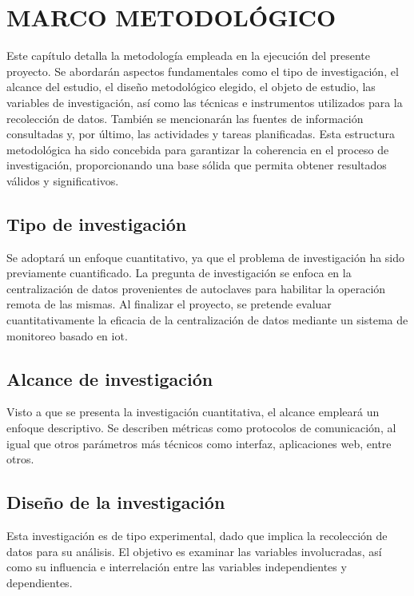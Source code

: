 
\newpage

%
%

\section{MARCO METODOLÓGICO}
Este capítulo detalla la metodología empleada en la ejecución del presente proyecto. Se abordarán aspectos fundamentales como el tipo de investigación, el alcance del estudio, el diseño metodológico elegido, el objeto de estudio, las variables de investigación, así como las técnicas e instrumentos utilizados para la recolección de datos. También se mencionarán las fuentes de información consultadas y, por último, las actividades y tareas planificadas. Esta estructura metodológica ha sido concebida para garantizar la coherencia en el proceso de investigación, proporcionando una base sólida que permita obtener resultados válidos y significativos.


\subsection{Tipo de investigación}
Se adoptará un enfoque cuantitativo, ya que el problema de investigación ha sido previamente cuantificado. La pregunta de investigación se enfoca en la centralización de datos provenientes de autoclaves para habilitar la operación remota de las mismas. Al finalizar el proyecto, se pretende evaluar cuantitativamente la eficacia de la centralización de datos mediante un sistema de monitoreo basado en \acrshort{iot}.

\subsection{Alcance de investigación}
Visto a que se presenta la investigación cuantitativa, el alcance empleará un enfoque descriptivo. Se describen métricas como protocolos de comunicación, al igual que otros parámetros más técnicos como interfaz, aplicaciones web, entre otros.

\subsection{Diseño de la investigación}
Esta investigación es de tipo experimental, dado que implica la recolección de datos para su análisis. El objetivo es examinar las variables involucradas, así como su influencia e interrelación entre las variables independientes y dependientes.

